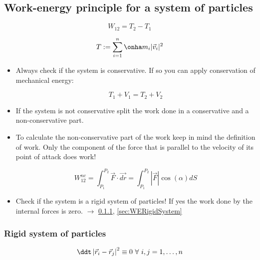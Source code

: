 \documentclass[10pt,a4paper]{scrartcl}
\begin{document}
\begin{multicols*}{2}
\subsection{Work-energy principle for a system of particles}

\begin{equation*}
W_{12}=T_2-T_1
\end{equation*}

\begin{equation*}
T:=\sum\limits_{i=1}^n\onha m_i|\vec{v}_i|^2
\end{equation*}


\begin{itemize}
\item Always check if the system is conservative. If so you can apply conservation of mechanical energy:

\[T_1 + V_1 = T_2 + V_2\]
\item If the system is not conservative split the work done in a conservative and a non-conservative part.
\item To calculate the non-conservative part of the work keep in mind the definition of work. Only the component of the force that is parallel to the velocity of its point of attack does work!

\[W_{12}^{nc}=\int_{P_1}^{P_2}\vec{F}\cdot\vec{dr}=\int_{P_1}^{P_2}|\vec{F}|\cos(\alpha)dS\]
\item Check if the system is a rigid system of particles! If yes the work done by the internal forces is zero. $\rightarrow$ \ref{sec:RigidSystem}, \ref{sec:WERigidSystem}
\end{itemize}


\subsubsection{Rigid system of particles}
\label{sec:RigidSystem}

\begin{equation*}
\ddt\left|\vec{r}_i-\vec{r}_j\right|^2 \equiv 0\ \forall\ i,j=1,\ldots,n
\end{equation*}



\end{multicols*}
\end{document}
